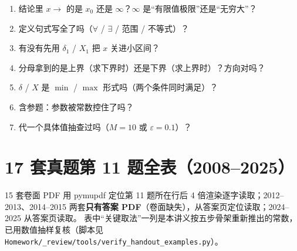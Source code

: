\documentclass[11pt,a4paper]{ctexart}
\newcommand{\eps}{\varepsilon}
\newcounter{exa}[section]
\begin{document}
\begin{enumerate}
\item[$\square$] 结论里 $x\to$ 的是 $x_0$ 还是 $\infty$？$\infty$ 是“有限值极限”还是“无穷大”？
\item[$\square$] 定义句式写全了吗（$\forall$ / $\exists$ / 范围 / 不等式）？
\item[$\square$] 有没有先用 $\delta_1$ / $X_1$ 把 $x$ 关进小区间？
\item[$\square$] 分母拿到的是上界（求下界时）还是下界（求上界时）？方向对吗？
\item[$\square$] $\delta$ / $X$ 是 $\min$ / $\max$ 形式吗（两个条件同时满足）？
\item[$\square$] 含参题：参数被常数控住了吗？
\item[$\square$] 代一个具体值抽查过吗（$M=10$ 或 $\eps=0.1$）？
\end{enumerate}

\appendix
\section{17 套真题第 11 题全表（2008--2025）}

\begin{notebox}[数据来源与核对方式]
15 套卷面 PDF 用 pymupdf 定位第 11 题所在行后 4 倍渲染逐字读取；2012--2013、2014--2015 两套\textbf{只有答案 PDF}（卷面缺失），从答案页定位读取；2024--2025 从答案页读取。
表中“关键取法”一列是本讲义按五步骨架重新推出的常数，已用数值抽样复核（脚本见 \texttt{Homework/\_review/tools/verify\_handout\_examples.py}）。
\end{notebox}
\end{document}
